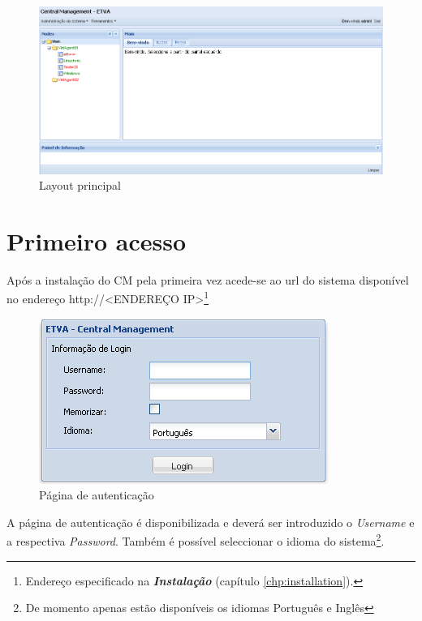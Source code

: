 \begin{figure}[H]
	\begin{center}
	\includegraphics[scale=0.45]{screenshots/principal.png}
	\caption{Layout principal}
	\label{fig:principal}
	\end{center}
\end{figure}

\pagebreak


\section{Primeiro acesso}
\label{sec:first_access}
Após a instalação do CM pela primeira vez acede-se ao url do sistema disponível no endereço http://<ENDEREÇO IP>\footnote{Endereço especificado na {\bf \emph{Instalação}} (capítulo \ref{chp:installation}).}

\begin{figure}[H]
	\begin{center}
	\includegraphics[scale=0.7]{screenshots/login.png}
	\caption{Página de autenticação}
	\label{fig:login}
	\end{center}
\end{figure}

A página de autenticação é disponibilizada e deverá ser introduzido o \emph{Username} e a respectiva \emph{Password}. Também é possível seleccionar o idioma do sistema\footnote{De momento apenas estão disponíveis os idiomas Português e Inglês}.

